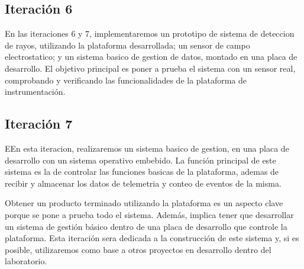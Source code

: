 \subsection{Iteración 6} %
\label{sub:iteracion_6}

En las iteraciones 6 y 7, implementaremos un prototipo de sistema de deteccion de rayos, utilizando la plataforma desarrollada; un sensor de campo electrostatico; y un sistema basico de gestion de datos, montado en una placa de desarrollo.
El objetivo principal es poner a prueba el sistema con un sensor real, comprobando y verificando las funcionalidades de la plataforma de instrumentación.


\subsection{Iteración 7} %
\label{sub:iteracion_7}

EEn esta iteracion, realizaremos un sistema basico de gestion, en una placa de desarrollo con un sistema operativo embebido. La función principal de este sistema es la de controlar las funciones basicas de la plataforma, ademas de recibir y almacenar los datos de telemetria y conteo de eventos de la misma.

Obtener un producto terminado utilizando la plataforma es un aspecto clave porque se pone a prueba todo el sistema. Además, implica tener que desarrollar un sistema de gestión básico dentro de una placa de desarrollo que controle la plataforma. Esta iteración sera dedicada a la construcción de este sistema y, si es posible, utilizaremos como base a otros proyectos en desarrollo dentro del laboratorio.







